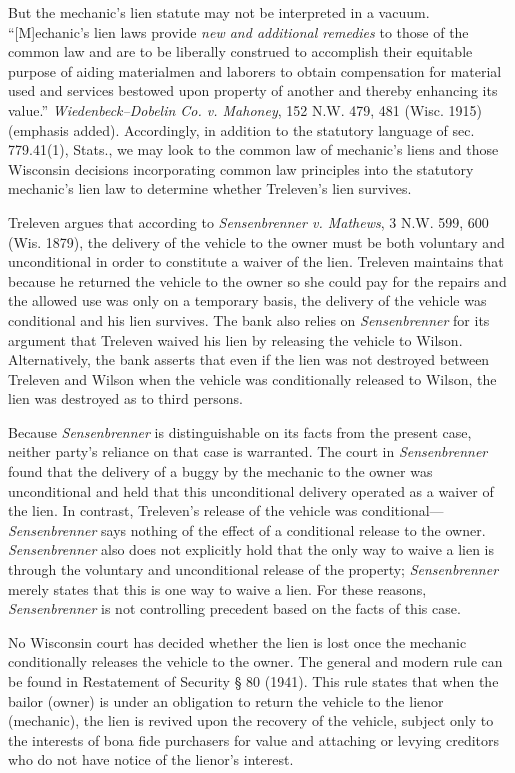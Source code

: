 But the mechanic's lien statute may not be interpreted in a vacuum.
``[M]echanic's lien laws provide \textit{new and additional remedies} to those
of the common law and are to be liberally construed to accomplish their
equitable purpose of aiding materialmen and laborers to obtain compensation for
material used and services bestowed upon property of another and thereby
enhancing its value.'' \textit{Wiedenbeck--Dobelin Co. v. Mahoney}, 152 N.W.
479, 481 (Wisc. 1915) (emphasis added). Accordingly, in addition to the
statutory language of sec. 779.41(1), Stats., we may look to the common law of
mechanic's liens and those Wisconsin decisions incorporating common law
principles into the statutory mechanic's lien law to determine whether
Treleven's lien survives.

Treleven argues that according to \textit{Sensenbrenner v. Mathews}, 3 N.W. 599,
600 (Wis. 1879), the delivery of the vehicle to the owner must be both
voluntary and unconditional in order to constitute a waiver of the lien.
Treleven maintains that because he returned the vehicle to the owner so she
could pay for the repairs and the allowed use was only on a temporary basis,
the delivery of the vehicle was conditional and his lien survives. The bank
also relies on \textit{Sensenbrenner} for its argument that Treleven waived his
lien by releasing the vehicle to Wilson. Alternatively, the bank asserts that
even if the lien was not destroyed between Treleven and Wilson when the vehicle
was conditionally released to Wilson, the lien was destroyed as to third
persons.

Because \textit{Sensenbrenner} is distinguishable on its facts from the present
case, neither party's reliance on that case is warranted. The court in
\textit{Sensenbrenner} found that the delivery of a buggy by the mechanic to
the owner was unconditional and held that this unconditional delivery operated
as a waiver of the lien. In contrast, Treleven's release of the vehicle was
conditional---\emph{Sensenbrenner} says nothing of  the effect of a conditional
release to the owner. \emph{Sensenbrenner} also does not explicitly hold that
the only way to waive a lien is through the voluntary and unconditional release
of the property; \emph{Sensenbrenner} merely states that this is one way to
waive a lien. For these reasons, \emph{Sensenbrenner} is not controlling
precedent based on the facts of this case.

No Wisconsin court has decided whether the lien is lost once the mechanic
conditionally releases the vehicle to the owner. The general and modern rule
can be found in Restatement of Security {\S} 80 (1941). This rule states that
when the bailor (owner) is under an obligation to return the vehicle to the
lienor (mechanic), the lien is revived upon the recovery of the vehicle,
subject only to the interests of bona fide purchasers for value and attaching
or levying creditors who do not have notice of the lienor's interest.

